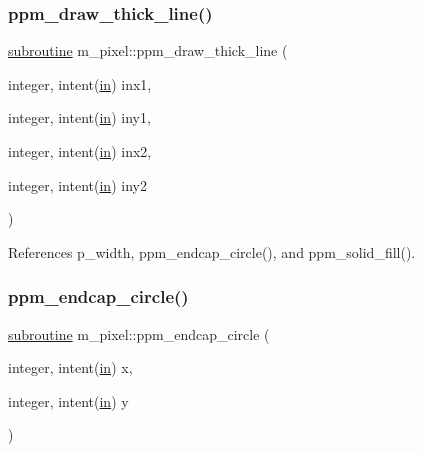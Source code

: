 \subsubsection{\texorpdfstring{ppm\+\_\+draw\+\_\+thick\+\_\+line()}{ppm\_draw\_thick\_line()}}
{\footnotesize\ttfamily \hyperlink{M__stopwatch_83_8txt_acfbcff50169d691ff02d4a123ed70482}{subroutine} m\+\_\+pixel\+::ppm\+\_\+draw\+\_\+thick\+\_\+line (\begin{DoxyParamCaption}\item[{integer, intent(\hyperlink{M__journal_83_8txt_afce72651d1eed785a2132bee863b2f38}{in})}]{inx1,  }\item[{integer, intent(\hyperlink{M__journal_83_8txt_afce72651d1eed785a2132bee863b2f38}{in})}]{iny1,  }\item[{integer, intent(\hyperlink{M__journal_83_8txt_afce72651d1eed785a2132bee863b2f38}{in})}]{inx2,  }\item[{integer, intent(\hyperlink{M__journal_83_8txt_afce72651d1eed785a2132bee863b2f38}{in})}]{iny2 }\end{DoxyParamCaption})\hspace{0.3cm}{\ttfamily [private]}}



References p\+\_\+width, ppm\+\_\+endcap\+\_\+circle(), and ppm\+\_\+solid\+\_\+fill().

\mbox{\label{namespacem__pixel_aede24c612504a3e416840e6242c2d8fb}} 
\subsubsection{\texorpdfstring{ppm\+\_\+endcap\+\_\+circle()}{ppm\_endcap\_circle()}}
{\footnotesize\ttfamily \hyperlink{M__stopwatch_83_8txt_acfbcff50169d691ff02d4a123ed70482}{subroutine} m\+\_\+pixel\+::ppm\+\_\+endcap\+\_\+circle (\begin{DoxyParamCaption}\item[{integer, intent(\hyperlink{M__journal_83_8txt_afce72651d1eed785a2132bee863b2f38}{in})}]{x,  }\item[{integer, intent(\hyperlink{M__journal_83_8txt_afce72651d1eed785a2132bee863b2f38}{in})}]{y }\end{DoxyParamCaption})}



